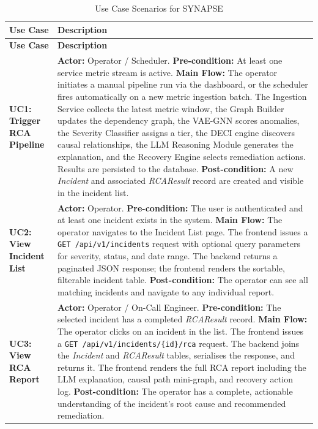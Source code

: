 \begin{center}
\begin{longtable}{|p{4cm}|p{9.8cm}|}
\caption{Use Case Scenarios for SYNAPSE} \label{tab:use_cases} \\
\hline
\textbf{Use Case} & \textbf{Description} \\
\hline
\endfirsthead
\hline
\textbf{Use Case} & \textbf{Description} \\
\hline
\endhead
\hline
\endfoot

\textbf{UC1: Trigger RCA Pipeline} &
\textbf{Actor:} Operator / Scheduler. \newline
\textbf{Pre-condition:} At least one service metric stream is active. \newline
\textbf{Main Flow:} The operator initiates a manual pipeline run via the dashboard, or the scheduler fires automatically on a new metric ingestion batch. The Ingestion Service collects the latest metric window, the Graph Builder updates the dependency graph, the VAE-GNN scores anomalies, the Severity Classifier assigns a tier, the DECI engine discovers causal relationships, the LLM Reasoning Module generates the explanation, and the Recovery Engine selects remediation actions. Results are persisted to the database. \newline
\textbf{Post-condition:} A new \textit{Incident} and associated \textit{RCAResult} record are created and visible in the incident list. \\
\hline

\textbf{UC2: View Incident List} &
\textbf{Actor:} Operator. \newline
\textbf{Pre-condition:} The user is authenticated and at least one incident exists in the system. \newline
\textbf{Main Flow:} The operator navigates to the Incident List page. The frontend issues a \texttt{GET /api/v1/incidents} request with optional query parameters for severity, status, and date range. The backend returns a paginated JSON response; the frontend renders the sortable, filterable incident table. \newline
\textbf{Post-condition:} The operator can see all matching incidents and navigate to any individual report. \\
\hline

\textbf{UC3: View RCA Report} &
\textbf{Actor:} Operator / On-Call Engineer. \newline
\textbf{Pre-condition:} The selected incident has a completed \textit{RCAResult} record. \newline
\textbf{Main Flow:} The operator clicks on an incident in the list. The frontend issues a \texttt{GET /api/v1/incidents/\{id\}/rca} request. The backend joins the \textit{Incident} and \textit{RCAResult} tables, serialises the response, and returns it. The frontend renders the full RCA report including the LLM explanation, causal path mini-graph, and recovery action log. \newline
\textbf{Post-condition:} The operator has a complete, actionable understanding of the incident's root cause and recommended remediation. \\
\hline


\end{longtable}
\end{center}
